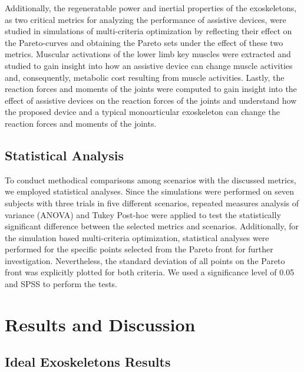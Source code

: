 \documentclass[10pt,letterpaper]{article}
\begin{document}
Additionally, the regeneratable power and inertial properties of the exoskeletons, as two critical metrics for analyzing the performance of assistive devices, were studied in simulations of multi-criteria optimization by reflecting their effect on the Pareto-curves and obtaining the Pareto sets under the effect of these two metrics.
Muscular activations of the lower limb key muscles were extracted and studied to gain insight into how an assistive device can change muscle activities and, consequently, metabolic cost resulting from muscle activities. 
Lastly, the reaction forces and moments of the joints  were computed to gain insight into the effect of assistive devices on the reaction forces of the joints and understand how the proposed device and a typical monoarticular exoskeleton can change the reaction forces and moments of the joints. 
\subsection*{Statistical Analysis}
To conduct methodical comparisons among scenarios with the discussed metrics, we employed statistical analyses. Since the simulations were performed on seven subjects with three trials in five different scenarios, repeated measures analysis of variance (ANOVA) and Tukey Post-hoc were applied to test the statistically significant difference between the selected metrics and scenarios.  Additionally, for the simulation based multi-criteria optimization, statistical analyses were performed for the specific points selected from the Pareto front for further investigation. Nevertheless, the standard deviation of all points on the Pareto front was explicitly plotted for both criteria. We used a significance level of 0.05 and SPSS \cite{spss} to perform the tests. 
\section*{Results and Discussion}
\subsection*{Ideal Exoskeletons Results}
\end{document}
